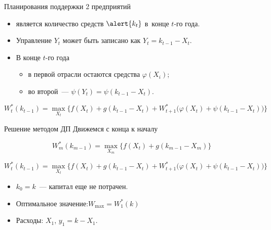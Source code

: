 \documentclass[unicode,11pt,notheorems,xcolor=table]{beamer}
\begin{document}
\begin{frame}{Планирования поддержки 2 предприятий}
\begin{itemize}
\item 
{} является количество средств $\alert{k_t}$ в~конце $t$-го года.    

\item 
  Управление  $Y_t$ может быть записано как $Y_t=k_{t-1}-X_t$.
  
\item {}
	В конце $t$-го года
	\begin{itemize}
	\item 	 
		в первой отрасли остаются средства \alert{$\varphi (X_i)$};
	\item 	 
		во второй~--- \alert{$\psi(Y_t)=\psi(k_{t-1}-X_t)$}.     
	\end{itemize}
\end{itemize}

\bigskip
{}
\alert{
$$
W^*_t(k_{t-1}) = \max_{X_t} \Big\{f(X_t)+g(k_{t-1}-X_t) + W^*_{t+1} \big(\varphi(X_t)+\psi(k_{t-1}-X_{t})\big)\Big\}
$$
}

\end{frame}
\begin{frame}{Решение методом ДП}
\alert{Движемся с конца к началу}

$$
W^*_m(k_{m-1}) = \max_{X_m} \big\{f(X_t)+g(k_{m-1}-X_m)\big\}
$$

$$
	W^*_t(k_{t-1}) = \max_{X_t} \Big\{f(X_t)+g(k_{t-1}-X_t) + W^*_{t+1} \big(\varphi(X_t)+\psi(k_{t-1}-X_{t})\big)\Big\}
$$


\begin{itemize}
\item 
	$k_0=k$~--- капитал еще не потрачен.
\item 
	Оптимальное значение:$ 	W_{\max} = W^*_{1}(k)$
\item 
	Расходы: $X_1$, $y_1=k-X_1$.
\end{itemize}


\end{frame}
\end{document}
